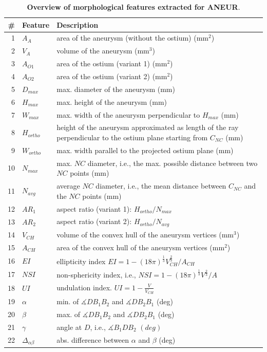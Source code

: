 \documentclass[
  oneside]{book}
\begin{document}
\begin{table}

\caption{\label{tab:08-morphological-features}\textbf{Overview of morphological features extracted for ANEUR}.}
\centering
\begin{tabular}[t]{rl>{\raggedright\arraybackslash}p{12cm}}
\toprule
\textbf{\#} & \textbf{Feature} & \textbf{Description}\\
\midrule
1 & $A_A$ & area of the aneurysm (without the ostium) (mm$^2$)\\
2 & $V_A$ & volume of the aneurysm (mm$^3$)\\
3 & $A_{O1}$ & area of the ostium (variant 1) (mm$^2$)\\
4 & $A_{O2}$ & area of the ostium (variant 2) (mm$^2$)\\
5 & $D_{max}$ & max. diameter of the aneurysm (mm)\\
6 & $H_{max}$ & max. height of the aneurysm (mm)\\
7 & $W_{max}$ & max. width of the aneurysm perpendicular to $H_{max}$ (mm)\\
8 & $H_{ortho}$ & height of the aneurysm approximated as length of the ray perpendicular to the ostium plane starting from $C_{NC}$ (mm)\\
9 & $W_{ortho}$ & max. width parallel to the projected ostium plane (mm)\\
10 & $N_{max}$ & max. $NC$ diameter, i.e., the max. possible distance between two $NC$ points (mm)\\
11 & $N_{avg}$ & average $NC$ diameter, i.e., the mean distance between $C_{NC}$ and the $NC$ points (mm)\\
12 & $AR_1$ & aspect ratio (variant 1): $H_{ortho}/N_{max}$\\
13 & $AR_2$ & aspect ratio (variant 2): $H_{ortho}/N_{avg}$\\
14 & $V_{CH}$ & volume of the convex hull of the aneurysm vertices (mm$^3$)\\
15 & $A_{CH}$ & area of the convex hull of the aneurysm vertices (mm$^2$)\\
16 & $EI$ & ellipticity index $EI=1-\left(18\pi\right)^{\frac{1}{3}}V_{CH}^{\frac{2}{3}}/A_{CH}$\\
17 & $NSI$ & non-sphericity index, i.e.,  $NSI=1-\left(18\pi\right)^{\frac{1}{3}}V^{\frac{2}{3}}/A$\\
18 & $UI$ & undulation index. $UI=1-\frac{V}{V_{CH}}$\\
19 & $\alpha$ & min. of $\measuredangle DB_1B_2$ and $\measuredangle DB_2B_1$ (deg)\\
20 & $\beta$ & max. of $\measuredangle DB_1B_2$ and $\measuredangle DB_2B_1$ (deg)\\
21 & $\gamma$ & angle at $D$, i.e., $\measuredangle B_1DB_2$ $(deg)$\\
22 & $\Delta_{\alpha\beta}$ & abs. difference between $\alpha$ and $\beta$ (deg)\\
\bottomrule
\end{tabular}
\end{table}
\end{document}
